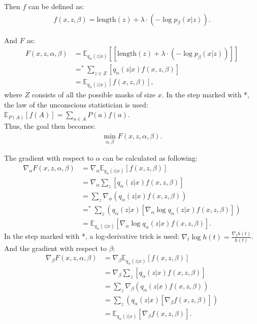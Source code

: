 \documentclass[a4paper, 12pt]{report}
\begin{document}
\noindent Then $f$ can be defined as:
\begin{align*}
    f(x, z, \beta) = \text{length}(z) + \lambda \cdot (-\log p_{\beta}(x|z)).
\end{align*}

\noindent And $F$ as:
\begin{align*}
    F(x, z, \alpha, \beta) &= \mathbb{E}_{q_{\alpha}(z|x)} [[\text{length}(z) + \lambda \cdot (-\log p_{\beta}(x|z))]] \\
    &=^{\ast} \sum_{z\in Z} [q_{\alpha}(z|x) f(x, z, \beta)] \\
    &= \mathbb{E}_{q_{\alpha}(z|x)}[f(x, z, \beta)],
\end{align*}
where $Z$ consists of all the possible masks of size $x$.
In the step marked with *, the law of the unconscious statistician is used: $\mathbb{E}_{P(A)}[f(A)] = \sum_{a \in A}P(a)f(a)$. \\

\noindent Thus, the goal then becomes:
\begin{align*}
    \min_{\alpha, \beta} F(x, z, \alpha, \beta).
\end{align*}

\noindent The gradient with respect to $\alpha$ can be calculated as following:
\begin{align*}
    \nabla_{\alpha} F(x, z, \alpha, \beta) &= \nabla_{\alpha} \mathbb{E}_{q_{\alpha}(z|x)} [f(x, z, \beta)] \\
    &= \nabla_{\alpha} \sum_z [q_{\alpha}(z|x) f(x, z, \beta)] \\
    &= \sum_z \nabla_{\alpha} (q_{\alpha}(z|x) f(x, z, \beta)) \\
    &=^\ast \sum_z (q_{\alpha}(z|x) [\nabla_{\alpha} \log q_{\alpha}(z|x) f(x, z, \beta)]) \\
    &= \mathbb{E}_{q_{\alpha}(z|x)} [\nabla_{\alpha} \log q_{\alpha}(z|x) f(x, z, \beta)].
\end{align*}
In the step marked with *, a log-derivative trick is used: $\nabla_t \log h(t) = \frac{\nabla_t h(t)}{h(t)}$. \\

\noindent And the gradient with respect to $\beta$:
\begin{align*}
    \nabla_{\beta} F(x, z, \alpha, \beta) &= \nabla_{\beta} \mathbb{E}_{q_{\alpha}(z|x)}[f(x, z, \beta)] \\
    &= \nabla_{\beta} \sum_z [q_{\alpha}(z|x)f(x, z, \beta)] \\
    &= \sum_z \nabla_{\beta} (q_{\alpha}(z|x)f(x, z, \beta)) \\
    &= \sum_z (q_{\alpha}(z|x) [\nabla_{\beta} f(x, z, \beta)]) \\
    &= \mathbb{E}_{q_{\alpha}(z|x)} [\nabla_{\beta} f(x, z, \beta)].
\end{align*}
\end{document}
